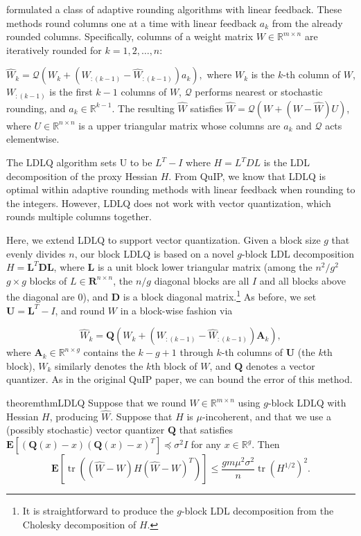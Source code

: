 \citet{chee2023quip} formulated a class of adaptive rounding algorithms with linear feedback. These methods round columns one at a time with linear feedback $a_k$ from the already rounded columns. Specifically, columns of a weight matrix $W \in \mathbb{R}^{m \times n}$ are iteratively rounded for $k = 1, 2, \dots, n$:

$\hat W_k = \mathcal{Q}(W_k + (W_{:(k-1)} - \hat W_{:(k-1)})a_k),$ where $W_k$ is the $k$-th column of $W$, $W_{:(k-1)}$ is the first $k-1$ columns of $W$, $\mathcal{Q}$ performs nearest or stochastic rounding, and $a_k \in \mathbb{R}^{k-1}$.
The resulting $\hat W$ satisfies $\hat W = \mathcal{Q}(W + (W - \hat W) U)$, where $U \in \mathbb{R}^{n \times n}$ is a upper triangular matrix whose columns are $a_k$ and $\mathcal{Q}$ acts elementwise.

The LDLQ algorithm sets U to be $L^T - I$ where $H = L^TDL$ is the LDL decomposition of the proxy Hessian $H$. From QuIP, we know that LDLQ is optimal within adaptive rounding methods with linear feedback when rounding to the integers. However, LDLQ does not work with vector quantization, which rounds multiple columns together.

Here, we extend LDLQ to support vector quantization. Given a block size $g$ that evenly divides $n$, our block LDLQ is based on a novel $g$-block LDL decomposition $H = \mathbf{L}^T \mathbf{D} \mathbf{L}$, where $\mathbf{L}$ is a unit block lower triangular matrix (among the $n^2/g^2$ $g \times g$ blocks of $L \in \mathbf{R}^{n \times n}$, the $n/g$ diagonal blocks are all $I$ and all blocks above the diagonal are $0$), and $\mathbf{D}$ is a block diagonal matrix.\footnote{It is straightforward to produce the $g$-block LDL decomposition from the Cholesky decomposition of $H$.} As before, we set $\mathbf{U} = \mathbf{L}^T - I$, and round $W$ in a block-wise fashion via

\[\hat W_k = \mathbf{Q}(W_k + (W_{:(k-1)} - \hat W_{:(k-1)})\mathbf{A}_k),\]
where $\mathbf{A}_k \in \mathbb{R}^{n \times g}$ contains the $k - g + 1$ through $k$-th columns of $\mathbf{U}$ (the $k$th block), $W_k$ similarly denotes the $k$th block of $W$, and $\mathbf{Q}$ denotes a vector quantizer. As in the original QuIP paper, we can bound the error of this method.

\begin{restatable}{theorem}{thmLDLQ}
\label{theorem:LDLQ}
Suppose that we round $W \in \mathbb{R}^{m \times n}$ using $g$-block LDLQ with Hessian $H$, producing $\hat W$. Suppose that $H$ is $\mu$-incoherent, and that we use a (possibly stochastic) vector quantizer $\mathbf{Q}$ that satisfies $\mathbf{E}[(\mathbf{Q}(x) - x)(\mathbf{Q}(x) - x)^T] \preceq \sigma^2 I$ for any $x \in \mathbb{R}^g$. Then
\[
\textstyle
\mathbf{E}[\operatorname{tr}((\hat W - W)H(\hat W - W)^T)]
\le
\frac{g m \mu^2 \sigma^2}{n} \operatorname{tr}(H^{1/2})^2.
\]
\end{restatable}

